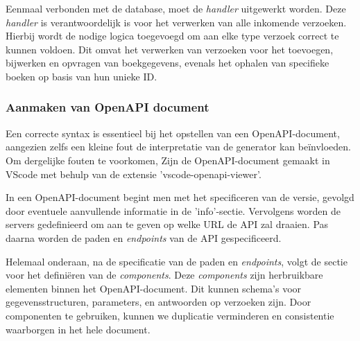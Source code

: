 Eenmaal verbonden met de database, moet de \textit{handler} uitgewerkt worden. Deze \textit{handler} is verantwoordelijk is voor het verwerken van alle inkomende verzoeken. Hierbij wordt de nodige logica toegevoegd om aan elke type verzoek correct te kunnen voldoen. Dit omvat het verwerken van verzoeken voor het toevoegen, bijwerken en opvragen van boekgegevens, evenals het ophalen van specifieke boeken op basis van hun unieke ID.


\subsubsection{Aanmaken van OpenAPI document}

Een correcte syntax is essentieel bij het opstellen van een OpenAPI-document, aangezien zelfs een kleine fout de interpretatie van de generator kan beïnvloeden. Om dergelijke fouten te voorkomen, Zijn de OpenAPI-document gemaakt in VScode met behulp van de extensie 'vscode-openapi-viewer'. 

In een OpenAPI-document begint men met het specificeren van de versie, gevolgd door eventuele aanvullende informatie in de 'info'-sectie. Vervolgens worden de servers gedefinieerd om aan te geven op welke URL de API zal draaien. Pas daarna worden de paden en \textit{endpoints} van de API gespecificeerd.

Helemaal onderaan, na de specificatie van de paden en \textit{endpoints}, volgt de sectie voor het definiëren van de \textit{components}. Deze \textit{components} zijn herbruikbare elementen binnen het OpenAPI-document. Dit kunnen schema's voor gegevensstructuren, parameters, en antwoorden op verzoeken zijn. Door componenten te gebruiken, kunnen we duplicatie verminderen en consistentie waarborgen in het hele document.

